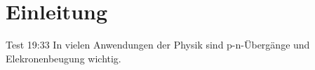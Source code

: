 \section{Einleitung}
\label{cap:Einleitung}

Test 19:33
In vielen Anwendungen der Physik sind p-n-Übergänge und Elekronenbeugung wichtig. 


